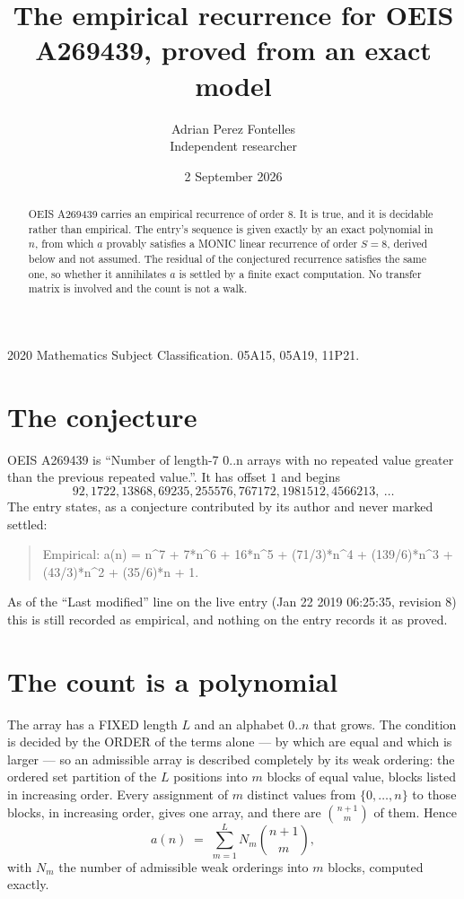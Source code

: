 \documentclass[11pt,a4paper]{article}
\title{The empirical recurrence for OEIS A269439, proved from an exact model}
\author{Adrian Perez Fontelles\\ \small Independent researcher}
\date{2 September 2026}
\theoremstyle{plain}
\theoremstyle{definition}
\begin{document}
\maketitle

\begin{abstract}
OEIS A269439 carries an empirical recurrence of order $8$. It is true, and it is
decidable rather than empirical. The entry's sequence is given exactly by an exact polynomial in $n$, from
which $a$ provably satisfies a MONIC linear recurrence of order $S=8$, derived below and not
assumed. The residual of the conjectured recurrence satisfies the same one, so whether it
annihilates $a$ is settled by a finite exact computation. No transfer matrix is involved and
the count is not a walk.
\end{abstract}

\noindent\small 2020 Mathematics Subject Classification. 05A15, 05A19, 11P21.\normalsize

\section{The conjecture}

OEIS A269439 is ``Number of length-7 0..n arrays with no repeated value greater than the previous repeated value.''. It has offset $1$ and begins
\[
92, 1722, 13868, 69235, 255576, 767172, 1981512, 4566213,\ \dots
\]
The entry states, as a conjecture contributed by its author and never marked settled:
\begin{quote}
Empirical: a(n) = n\^{}7 + 7*n\^{}6 + 16*n\^{}5 + (71/3)*n\^{}4 + (139/6)*n\^{}3 + (43/3)*n\^{}2 + (35/6)*n + 1.
\end{quote}
As of the ``Last modified'' line on the live entry (Jan 22 2019 06:25:35, revision 8)
this is still recorded as empirical, and nothing on the entry records it as proved.

\section{The count is a polynomial}

The array has a FIXED length $L$ and an alphabet $0..n$ that grows. The condition is decided by
the ORDER of the terms alone --- by which are equal and which is larger --- so an admissible
array is described completely by its weak ordering: the ordered set partition of the $L$
positions into $m$ blocks of equal value, blocks listed in increasing order. Every assignment
of $m$ distinct values from $\{0,\dots,n\}$ to those blocks, in increasing order, gives one
array, and there are $\binom{n+1}{m}$ of them. Hence
\[
a(n)\;=\;\sum_{m=1}^{L} N_m\binom{n+1}{m},
\]
with $N_m$ the number of admissible weak orderings into $m$ blocks, computed exactly.
\end{document}

